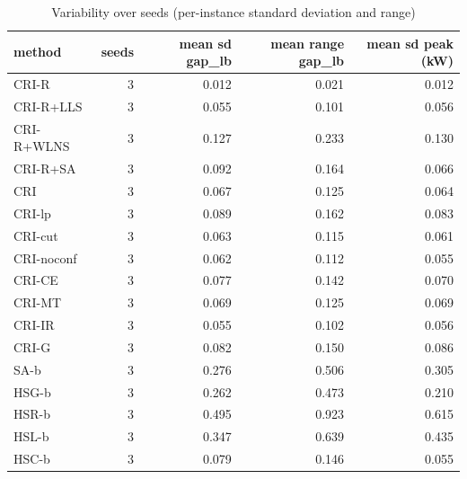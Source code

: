 \begin{table}[htbp]
\centering
\small
\caption{Variability over seeds (per-instance standard deviation and range)}
\label{tab:E5_ablation_b10_seeds}
\begin{tabular}{lrrrr}
\toprule
method & seeds & mean sd gap\_lb & mean range gap\_lb & mean sd peak (kW) \\
\midrule
CRI-R & 3 & 0.012 & 0.021 & 0.012 \\
CRI-R+LLS & 3 & 0.055 & 0.101 & 0.056 \\
CRI-R+WLNS & 3 & 0.127 & 0.233 & 0.130 \\
CRI-R+SA & 3 & 0.092 & 0.164 & 0.066 \\
CRI & 3 & 0.067 & 0.125 & 0.064 \\
CRI-lp & 3 & 0.089 & 0.162 & 0.083 \\
CRI-cut & 3 & 0.063 & 0.115 & 0.061 \\
CRI-noconf & 3 & 0.062 & 0.112 & 0.055 \\
CRI-CE & 3 & 0.077 & 0.142 & 0.070 \\
CRI-MT & 3 & 0.069 & 0.125 & 0.069 \\
CRI-IR & 3 & 0.055 & 0.102 & 0.056 \\
CRI-G & 3 & 0.082 & 0.150 & 0.086 \\
SA-b & 3 & 0.276 & 0.506 & 0.305 \\
HSG-b & 3 & 0.262 & 0.473 & 0.210 \\
HSR-b & 3 & 0.495 & 0.923 & 0.615 \\
HSL-b & 3 & 0.347 & 0.639 & 0.435 \\
HSC-b & 3 & 0.079 & 0.146 & 0.055 \\
\bottomrule
\end{tabular}
\end{table}
